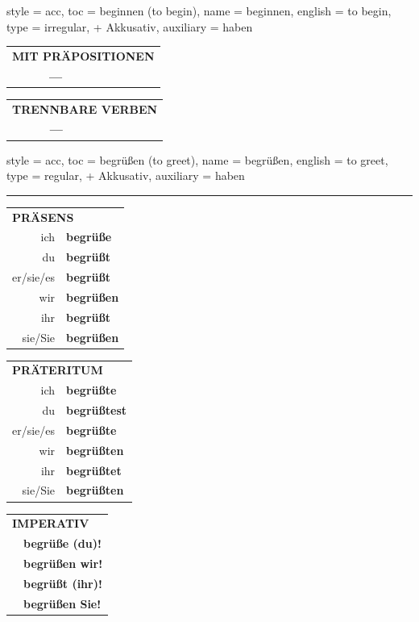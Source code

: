 \begin{verbentry}{
  style = {acc},
  toc = {beginnen (to begin)},
  name = {beginnen},
  english = {to begin},
  type = {irregular, + Akkusativ},
  auxiliary = {haben}
}
\vspace{10pt}

\begin{tabular}{lll}
\multicolumn{3}{l}{\textbf{MIT PRÄPOSITIONEN}}\\
& \textbf{---} & \\
\end{tabular}
\hfill
\begin{tabular}{lll}
\multicolumn{3}{l}{\textbf{TRENNBARE VERBEN}}\\
& \textbf{---} & \\
\end{tabular}

\vspace{-5pt}
\end{verbentry}

\begin{verbentry}{
  style = {acc},
  toc = {begrüßen (to greet)},
  name = {begrüßen},
  english = {to greet},
  type = {regular, + Akkusativ},
  auxiliary = {haben}
}


\vspace{5pt}
\hrule
\vspace{5pt}

\begin{tabular}{rl}
\multicolumn{2}{l}{\textbf{PRÄSENS}}\\
ich & \textbf{begrüße}\\
du & \textbf{begrüßt}\\
er/sie/es & \textbf{begrüßt}\\
wir & \textbf{begrüßen}\\
ihr & \textbf{begrüßt}\\
sie/Sie & \textbf{begrüßen}\\
\end{tabular}
\hfill
\begin{tabular}{rl}
\multicolumn{2}{l}{\textbf{PRÄTERITUM}}\\
ich & \textbf{begrüßte}\\
du & \textbf{begrüßtest}\\
er/sie/es & \textbf{begrüßte}\\
wir & \textbf{begrüßten}\\
ihr & \textbf{begrüßtet}\\
sie/Sie & \textbf{begrüßten}\\
\end{tabular}
\hfill
\begin{tabular}{rl}
\multicolumn{2}{l}{\textbf{IMPERATIV}}\\
& \textbf{begrüße (du)!}\\
& \textbf{begrüßen wir!}\\
& \textbf{begrüßt (ihr)!}\\
& \textbf{begrüßen Sie!}\\
\end{tabular}


\end{verbentry}

